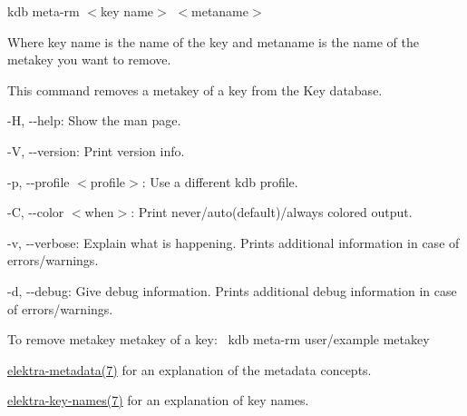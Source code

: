 {\ttfamily kdb meta-\/rm $<$key name$>$ $<$metaname$>$}

Where {\ttfamily key name} is the name of the key and {\ttfamily metaname} is the name of the metakey you want to remove.

This command removes a metakey of a key from the Key database.


\begin{DoxyItemize}
\item {\ttfamily -\/H}, {\ttfamily -\/-\/help}\+: Show the man page.
\item {\ttfamily -\/V}, {\ttfamily -\/-\/version}\+: Print version info.
\item {\ttfamily -\/p}, {\ttfamily -\/-\/profile $<$profile$>$}\+: Use a different kdb profile.
\item {\ttfamily -\/C}, {\ttfamily -\/-\/color $<$when$>$}\+: Print never/auto(default)/always colored output.
\item {\ttfamily -\/v}, {\ttfamily -\/-\/verbose}\+: Explain what is happening. Prints additional information in case of errors/warnings.
\item {\ttfamily -\/d}, {\ttfamily -\/-\/debug}\+: Give debug information. Prints additional debug information in case of errors/warnings.
\end{DoxyItemize}

To remove metakey {\ttfamily metakey} of a key\+:~\newline
 {\ttfamily kdb meta-\/rm user/example metakey}


\begin{DoxyItemize}
\item \mbox{\hyperlink{doc_help_elektra-metadata_md}{elektra-\/metadata(7)}} for an explanation of the metadata concepts.
\item \mbox{\hyperlink{doc_help_elektra-key-names_md}{elektra-\/key-\/names(7)}} for an explanation of key names. 
\end{DoxyItemize}